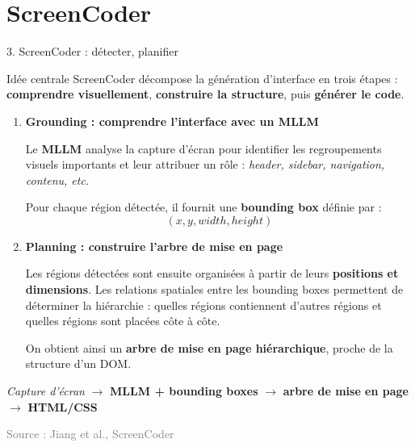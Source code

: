 \documentclass[aspectratio=169,11pt]{beamer}
\newcommand{\source}[1]{\scriptsize\textcolor{gray}{Source : #1}}
\begin{document}
\section{ScreenCoder}

\begin{frame}{3. ScreenCoder : détecter, planifier}

\begin{block}{Idée centrale}
ScreenCoder décompose la génération d'interface en trois étapes :
\textbf{comprendre visuellement}, \textbf{construire la structure}, puis
\textbf{générer le code}.
\end{block}

\begin{enumerate}
\item \textbf{Grounding : comprendre l'interface avec un MLLM}


Le \textbf{MLLM} analyse la capture d'écran pour identifier les
regroupements visuels importants et leur attribuer un rôle :
\textit{header, sidebar, navigation, contenu, etc.}

Pour chaque région détectée, il fournit une
\textbf{bounding box} définie par :
\[
(x,y,width,height)
\]

\item \textbf{Planning : construire l'arbre de mise en page}

Les régions détectées sont ensuite organisées à partir de leurs
\textbf{positions et dimensions}. Les relations spatiales entre les
bounding boxes permettent de déterminer la hiérarchie :
quelles régions contiennent d'autres régions et quelles régions sont
placées côte à côte.

On obtient ainsi un \textbf{arbre de mise en page hiérarchique},
proche de la structure d'un DOM.



\end{enumerate}

\begin{center}
\textit{Capture d'écran}
$\rightarrow$
\textbf{MLLM + bounding boxes}
$\rightarrow$
\textbf{arbre de mise en page}
$\rightarrow$
\textbf{HTML/CSS}
\end{center}

\source{Jiang et al., ScreenCoder}
\end{frame}
\end{document}
